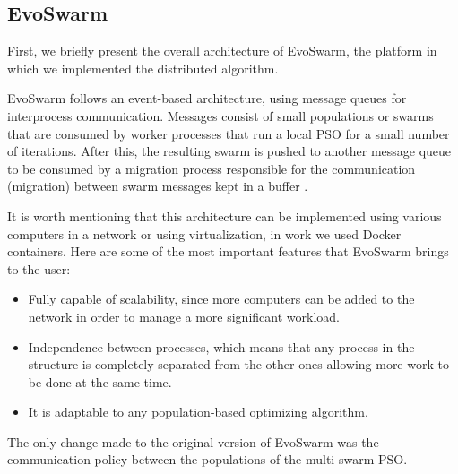 \documentclass[runningheads]{llncs}
\begin{document}
\subsection{EvoSwarm} 
First, we briefly present the overall architecture of EvoSwarm, the 
platform in which we implemented the distributed algorithm. 

EvoSwarm follows an event-based architecture, using message queues for
interprocess communication. Messages consist of small populations or swarms that
are consumed by worker processes that run a local PSO for a small number of
iterations. After this, the resulting swarm is pushed to another message queue
to be consumed by a migration process responsible for the communication
(migration) between swarm messages kept in a buffer \cite{b18}.



It is worth mentioning that this architecture can be implemented using various
computers in a network or using virtualization, in work we used Docker containers. 
Here are some of the most important features that
EvoSwarm brings to the user:

\begin{itemize} 
  
  \item Fully capable of scalability, since more computers can be added to the
  network in order to manage a more significant workload.
    
    \item Independence between processes, which means that any process in the
    structure is completely separated from the other ones allowing more work to
    be done at the same time.
    
    \item It is adaptable to any population-based optimizing algorithm.
\end{itemize}

The only change made to the original version of EvoSwarm \cite{b18} was the
communication policy between the populations of the multi-swarm PSO.
\end{document}

